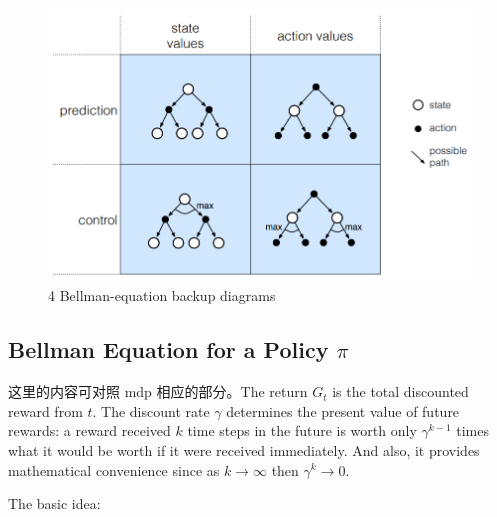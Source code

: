 \begin{figure}[!htb]
\centering
\includegraphics[scale=0.7]{pix/4-backup-diagrams.png}
\caption{4 Bellman-equation backup diagrams}
\end{figure}


\subsection{Bellman Equation for a Policy $\pi$}

这里的内容可对照 mdp 相应的部分。The return $G_t$ is the total discounted reward from $t$.
The discount rate $\gamma$ determines the present value of future rewards: a 
reward received $k$ time steps in the future is worth only $\gamma^{k-1}$ times 
what it would be worth if it were received immediately. And also, it provides 
mathematical convenience since as $k\rightarrow\infty$ then $\gamma^k\rightarrow 0$.

The basic idea:

